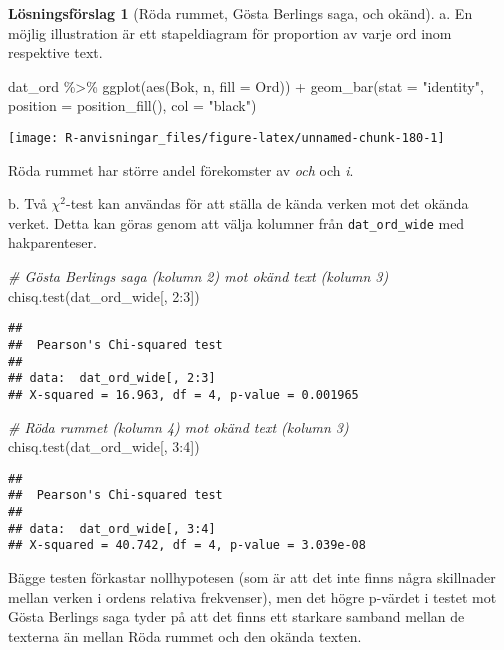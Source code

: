 \documentclass[
]{book}
\newenvironment{Shaded}{\begin{snugshade}}{\end{snugshade}}
\newcommand{\AttributeTok}[1]{\textcolor[rgb]{0.77,0.63,0.00}{#1}}
\newcommand{\CommentTok}[1]{\textcolor[rgb]{0.56,0.35,0.01}{\textit{#1}}}
\newcommand{\DecValTok}[1]{\textcolor[rgb]{0.00,0.00,0.81}{#1}}
\newcommand{\FunctionTok}[1]{\textcolor[rgb]{0.00,0.00,0.00}{#1}}
\newcommand{\NormalTok}[1]{#1}
\newcommand{\SpecialCharTok}[1]{\textcolor[rgb]{0.00,0.00,0.00}{#1}}
\newcommand{\StringTok}[1]{\textcolor[rgb]{0.31,0.60,0.02}{#1}}
\theoremstyle{definition}
\theoremstyle{definition}
\theoremstyle{definition}
\theoremstyle{definition}
\newtheorem{hypothesis}{Lösningsförslag}[chapter]
\theoremstyle{remark}
\begin{document}
\begin{hypothesis}[Röda rummet, Gösta Berlings saga, och okänd]
a. En möjlig illustration är ett stapeldiagram för proportion av varje ord inom respektive text.

\begin{Shaded}
\begin{Highlighting}[]
\NormalTok{dat\_ord }\SpecialCharTok{\%\textgreater{}\%}
  \FunctionTok{ggplot}\NormalTok{(}\FunctionTok{aes}\NormalTok{(Bok, n, }\AttributeTok{fill =}\NormalTok{ Ord)) }\SpecialCharTok{+}
  \FunctionTok{geom\_bar}\NormalTok{(}\AttributeTok{stat =} \StringTok{"identity"}\NormalTok{, }\AttributeTok{position =} \FunctionTok{position\_fill}\NormalTok{(), }\AttributeTok{col =} \StringTok{"black"}\NormalTok{)}
\end{Highlighting}
\end{Shaded}

\begin{center}\texttt{[image: R-anvisningar\_files/figure-latex/unnamed-chunk-180-1]} \end{center}

Röda rummet har större andel förekomster av \emph{och} och \emph{i}.

b. Två \(\chi^2\)-test kan användas för att ställa de kända verken mot det okända verket. Detta kan göras genom att välja kolumner från \texttt{dat\_ord\_wide} med hakparenteser.

\begin{Shaded}
\begin{Highlighting}[]
\CommentTok{\# Gösta Berlings saga (kolumn 2) mot okänd text (kolumn 3)}
\FunctionTok{chisq.test}\NormalTok{(dat\_ord\_wide[, }\DecValTok{2}\SpecialCharTok{:}\DecValTok{3}\NormalTok{])}
\end{Highlighting}
\end{Shaded}

\begin{verbatim}
## 
##  Pearson's Chi-squared test
## 
## data:  dat_ord_wide[, 2:3]
## X-squared = 16.963, df = 4, p-value = 0.001965
\end{verbatim}

\begin{Shaded}
\begin{Highlighting}[]
\CommentTok{\# Röda rummet (kolumn 4) mot okänd text (kolumn 3)}
\FunctionTok{chisq.test}\NormalTok{(dat\_ord\_wide[, }\DecValTok{3}\SpecialCharTok{:}\DecValTok{4}\NormalTok{])}
\end{Highlighting}
\end{Shaded}

\begin{verbatim}
## 
##  Pearson's Chi-squared test
## 
## data:  dat_ord_wide[, 3:4]
## X-squared = 40.742, df = 4, p-value = 3.039e-08
\end{verbatim}

Bägge testen förkastar nollhypotesen (som är att det inte finns några skillnader mellan verken i ordens relativa frekvenser), men det högre p-värdet i testet mot Gösta Berlings saga tyder på att det finns ett starkare samband mellan de texterna än mellan Röda rummet och den okända texten.
\end{hypothesis}
\end{document}
